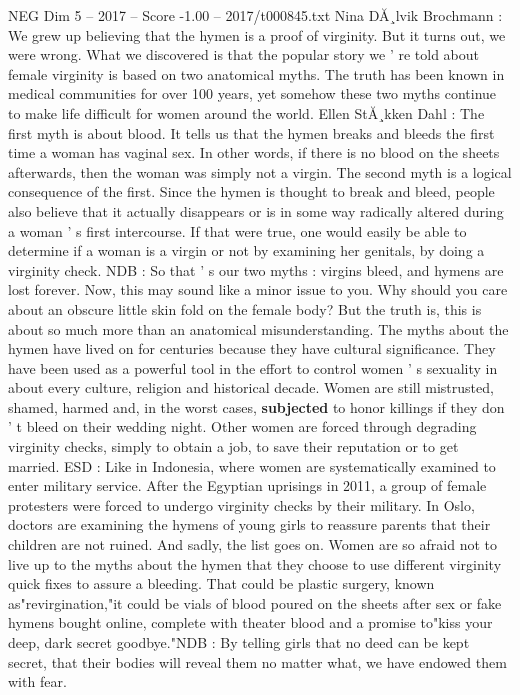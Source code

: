\begin{textsample}{NEG Dim 5 – 2017 – Score -1.00 – 2017/t000845.txt}  \label{ex:f5_neg_024}
Nina DĂ¸lvik Brochmann : We grew up believing that the hymen is a proof of virginity.
But it turns out, we were wrong.
What we discovered is that the popular story we ' re told about female virginity is based on two anatomical myths.
The truth has been known in medical communities for over 100 years, yet somehow these two myths continue to make life difficult for women around the world.
Ellen StĂ¸kken Dahl : The first myth is about blood.
It tells us that the hymen breaks and bleeds the first time a woman has vaginal sex.
In other words, if there is no blood on the sheets afterwards, then the woman was simply not a virgin.
The second myth is a logical consequence of the first.
Since the hymen is thought to break and bleed, people also believe that it actually disappears or is in some way radically altered during a woman ' s first intercourse.
If that were true, one would easily be able to determine if a woman is a virgin or not by examining her genitals, by doing a virginity check.
NDB : So that ' s our two myths : virgins bleed, and hymens are lost forever.
Now, this may sound like a minor issue to you.
Why should you care about an obscure little skin fold on the female body?
But the truth is, this is about so much more than an anatomical misunderstanding.
The myths about the hymen have lived on for centuries because they have cultural significance.
They have been used as a powerful tool in the effort to control women ' s sexuality in about every culture, religion and historical decade.
Women are still mistrusted, shamed, harmed and, in the worst cases, \textbf{subjected} to honor killings if they don ' t bleed on their wedding night.
Other women are forced through degrading virginity checks, simply to obtain a job, to save their reputation or to get married.
ESD : Like in Indonesia, where women are systematically examined to enter military service.
After the Egyptian uprisings in 2011, a group of female protesters were forced to undergo virginity checks by their military.
In Oslo, doctors are examining the hymens of young girls to reassure parents that their children are not ruined.
And sadly, the list goes on.
Women are so afraid not to live up to the myths about the hymen that they choose to use different virginity quick fixes to assure a bleeding.
That could be plastic surgery, known as"revirgination,"it could be vials of blood poured on the sheets after sex or fake hymens bought online, complete with theater blood and a promise to"kiss your deep, dark secret goodbye."NDB : By telling girls that no deed can be kept secret, that their bodies will reveal them no matter what, we have endowed them with fear.

\end{textsample}
